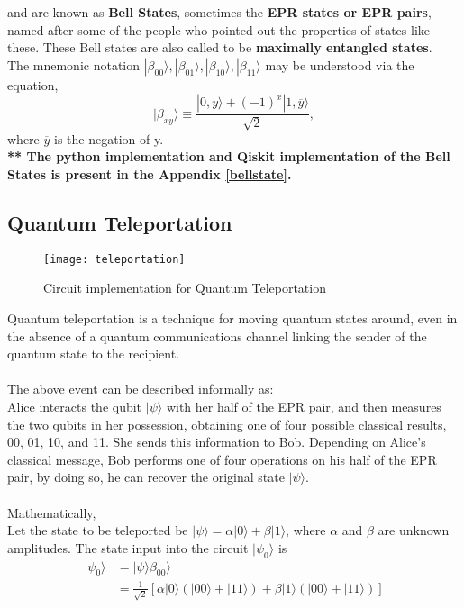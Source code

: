 \documentclass[12pt]{report}
\begin{document}
and are known as \textbf{Bell States}, sometimes the \textbf{EPR states or EPR pairs}, named after some of the people who pointed out the properties of states like these. These Bell states are also called to be \textbf{maximally entangled states}.\\
The mnemonic notation $|\beta_{00}\rangle, |\beta_{01}\rangle, |\beta_{10}\rangle, |\beta_{11}\rangle$  may be understood via the equation, 
\begin{equation}
|\beta_{xy}\rangle \equiv \frac{|0,y\rangle + (-1)^x |1,\overline{y}\rangle}{\sqrt{2}},
\end{equation}
where $\overline{y}$ is the negation of y. \\
\textbf{** The python implementation and Qiskit implementation of the Bell States is present in the Appendix \ref{bellstate}.} 
\subsection{Quantum Teleportation}
\begin{figure}[h]
\centering
\texttt{[image: teleportation]}
\caption{Circuit implementation for Quantum Teleportation}
\label{fig:teleportation}
\end{figure}
Quantum teleportation is a technique for moving quantum states around, even in the absence of a quantum communications channel linking the sender of the quantum state to the recipient. \\ \\
The above event can be described informally as: \\
Alice interacts the qubit $|\psi\rangle$ with her half of the EPR pair, and then measures the two qubits in her possession, obtaining one of four possible classical results, 00, 01, 10, and 11. She sends this information to Bob. Depending on Alice’s classical message, Bob performs one of four operations on his half of the EPR pair, by doing so, he can recover the original state $|\psi\rangle$. \\ \\
Mathematically,
\\
Let the state to be teleported be $|\psi\rangle = \alpha|0\rangle + \beta|1\rangle$, where $\alpha$ and $\beta$ are unknown amplitudes. The state input into the circuit $|\psi_0\rangle$ is 
\begin{equation}
\begin{split}
|\psi_0\rangle &= |\psi\rangle \beta_{00}\rangle \\
& = \frac{1}{\sqrt{2}} [\alpha|0\rangle(|00\rangle + |11\rangle) + \beta|1\rangle(|00\rangle + |11\rangle)] 
\end{split}
\end{equation}
\end{document}
